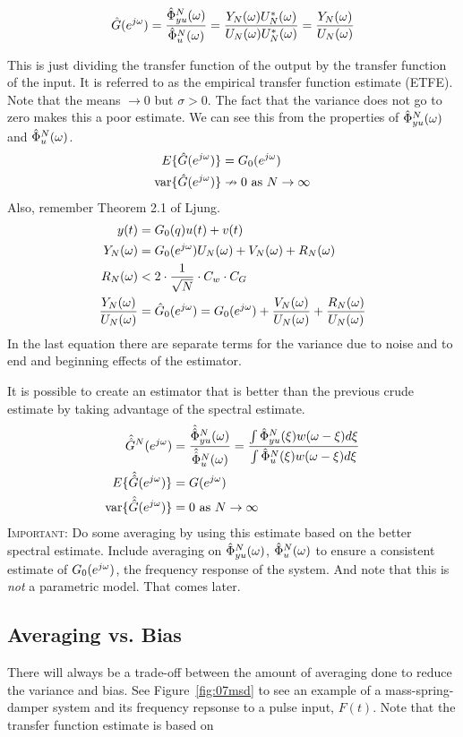 \begin{equation*}
\hat{G}(e^{j\omega}) = \frac{\hat{\Phi}_{yu}^N (\omega)}{\hat{\Phi}_u^N (\omega)} = \frac{Y_N(\omega)U_N^*(\omega)}{U_N(\omega)U_N^*(\omega)} = \frac{Y_N(\omega)}{U_N(\omega)}
\end{equation*}

This is just dividing the transfer function of the output by the transfer function of the input.
It is referred to as the empirical transfer function estimate (ETFE).
Note that the means $\to 0$ but $\sigma>0$.
The fact that the variance does not go to zero makes this a poor estimate.
We can see this from the properties of $\hat{\Phi}_{yu}^N (\omega)$ and $\hat{\Phi}_u^N (\omega)$.
\begin{align*}
E\{\hat{G}(e^{j\omega})\} &= G_0(e^{j\omega}) \\
\text{var}\{\hat{G}(e^{j\omega})\} &\nrightarrow 0 \text{~as~} N\to\infty
\end{align*}
Also, remember Theorem 2.1 of Ljung.
\begin{align*}
y(t) &= G_0(q)u(t) + v(t) \\
Y_N(\omega) &= G_0(e^{j\omega})U_N(\omega) + V_N(\omega) + R_N(\omega) \\
R_N(\omega) &< 2\cdot \frac{1}{\sqrt{N}}\cdot C_w\cdot C_G \\
\frac{Y_N(\omega)}{U_N(\omega)} &= \hat{G}_0(e^{j\omega}) = G_0(e^{j\omega}) + \frac{V_N(\omega)}{U_N(\omega)} + \frac{R_N(\omega)}{U_N(\omega)}
\end{align*}
In the last equation there are separate terms for the variance due to noise and to end and beginning effects of the estimator.

It is possible to create an estimator that is better than the previous crude estimate by taking advantage of the spectral estimate.
\begin{align*}
\hat{\hat{G}}^N(e^{j\omega}) &= \frac{\hat{\hat{\Phi}}_{yu}^N (\omega)}{\hat{\hat{\Phi}}_u^N (\omega)} = \frac{\int\hat{\Phi}_{yu}^N(\xi)w(\omega-\xi)d\xi}{\int \hat{\Phi}_u^N(\xi)w(\omega-\xi)d\xi} \\
E\{\hat{\hat{G}} (e^{j\omega})\} &= G(e^{j\omega}) \\
\text{var}\{\hat{\hat{G}}(e^{j\omega})\} &= 0 \text{~as~} N\to\infty
\end{align*}
\textsc{Important:} Do some averaging by using this estimate based on the better spectral estimate.
Include averaging on $\hat{\Phi}_{yu}^N (\omega)$, $\hat{\Phi}_u^N (\omega)$ to ensure a consistent estimate of $G_0(e^{j\omega})$, the frequency response of the system.
And note that this is \textit{not} a parametric model.
That comes later.

\subsection{Averaging vs. Bias}
There will always be a trade-off between the amount of averaging done to reduce the variance and bias.
See Figure~\ref{fig:07msd} to see an example of a mass-spring-damper system and its frequency repsonse to a pulse input, $F(t)$.
Note that the transfer function estimate is based on

